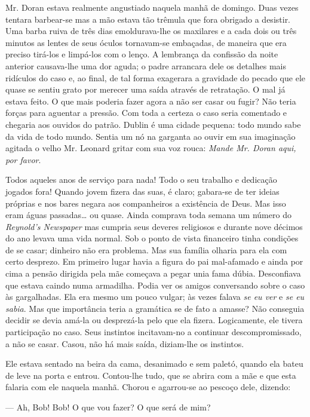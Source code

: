Mr. Doran estava realmente angustiado naquela manhã de domingo. Duas
vezes tentara barbear-se mas a mão estava tão trêmula que fora
obrigado a desistir. Uma barba ruiva de três dias emoldurava-lhe os
maxilares e a cada dois ou três minutos as lentes de seus óculos
tornavam-se embaçadas, de maneira que era preciso tirá-los e
limpá-los com o lenço. A lembrança da confissão da noite anterior
causava-lhe uma dor aguda; o padre arrancara dele os detalhes mais
ridículos do caso e, ao final, de tal forma exagerara a gravidade do
pecado que ele quase se sentiu grato por merecer uma saída através de
retratação. O mal já estava feito. O que mais poderia fazer agora a
não ser casar ou fugir? Não teria forças para aguentar a pressão. Com
toda a certeza o caso seria comentado e chegaria aos ouvidos do
patrão. Dublin é uma cidade pequena: todo mundo sabe da vida de todo
mundo. Sentia um nó na garganta ao ouvir em sua imaginação agitada o
velho Mr. Leonard gritar com sua voz rouca: \textit{Mande Mr. Doran aqui, por
favor}.

Todos aqueles anos de serviço para nada! Todo o seu trabalho e
dedicação jogados fora! Quando jovem fizera das suas, é claro;
gabara-se de ter ideias próprias e nos bares negara aos companheiros
a existência de Deus. Mas isso eram águas passadas\ldots{} ou quase. Ainda
comprava toda semana um número do \textit{Reynold's Newspaper} mas cumpria seus
deveres religiosos e durante nove décimos do ano levava uma vida
normal. Sob o ponto de vista financeiro tinha condições de se casar;
dinheiro não era problema. Mas sua família olharia para ela com certo
desprezo. Em primeiro
lugar havia a figura do pai mal-afamado e ainda por cima a pensão
dirigida pela mãe começava a pegar unia fama dúbia. Desconfiava que
estava caindo numa armadilha. Podia ver os amigos conversando sobre
o caso às gargalhadas. Ela era mesmo um pouco vulgar; às vezes falava
\textit{se eu ver} e \textit{se eu sabia}. Mas que importância teria a gramática se de
fato a amasse? Não conseguia decidir se devia amá-la ou desprezá-la
pelo que ela fizera. Logicamente, ele tivera participação no caso.
Seus instintos incitavam-no a continuar descompromissado, a não se
casar. Casou, não há mais saída, diziam-lhe os instintos.

Ele estava sentado na beira da cama, desanimado e sem paletó, quando
ela bateu de leve na porta e entrou. Contou-lhe tudo, que se abrira
com a mãe e que esta falaria com ele naquela manhã. Chorou e
agarrou-se ao pescoço dele, dizendo:

--- Ah, Bob! Bob! O que vou fazer? O que será de mim?

